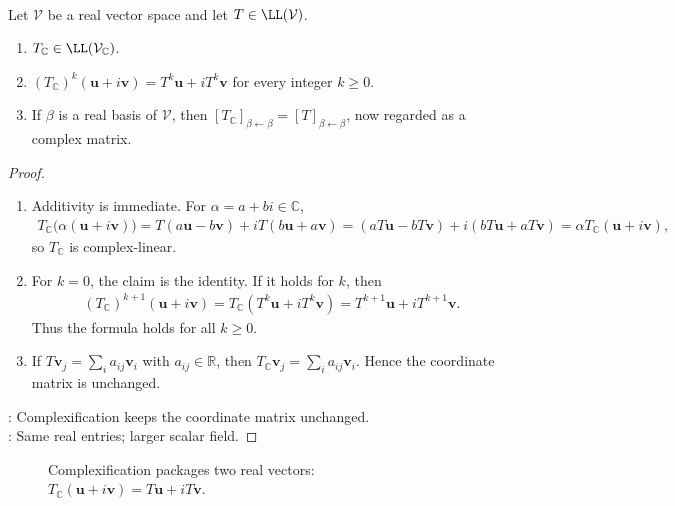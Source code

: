 \begin{proposition} \label{prop:complexification-operator-basic-properties} \\
Let $\mathcal{V}$ be a real vector space and let $T\in\LL(\mathcal{V})$.
\begin{enumerate}[label=(\roman*)]
\setlength{\itemsep}{0pt}
\item $T_{\mathbb{C}}\in\LL(\mathcal{V}_{\mathbb{C}})$.
\item $(T_{\mathbb{C}})^k(\mathbf{u}+i\mathbf{v})=T^k\mathbf{u}+iT^k\mathbf{v}$ for every integer $k\geq0$.
\item If $\beta$ is a real basis of $\mathcal{V}$, then $[T_{\mathbb{C}}]_{\beta\leftarrow\beta}=[T]_{\beta\leftarrow\beta}$, now regarded as a complex matrix.
\end{enumerate}
\begin{proof}
\begin{enumerate}[label=(\roman*)]
\setlength{\itemsep}{0pt}
\item Additivity is immediate. For $\alpha=a+bi\in\mathbb{C}$,
\begin{align}
T_{\mathbb{C}}\bigl(\alpha(\mathbf{u}+i\mathbf{v})\bigr) =T(a\mathbf{u}-b\mathbf{v})+iT(b\mathbf{u}+a\mathbf{v}) =(aT\mathbf{u}-bT\mathbf{v})+i(bT\mathbf{u}+aT\mathbf{v}) =\alpha T_{\mathbb{C}}(\mathbf{u}+i\mathbf{v}),
\nonumber
\end{align}
so $T_{\mathbb{C}}$ is complex-linear.
\item For $k=0$, the claim is the identity. If it holds for $k$, then
\begin{align}
(T_{\mathbb{C}})^{k+1}(\mathbf{u}+i\mathbf{v}) =T_{\mathbb{C}}(T^k\mathbf{u}+iT^k\mathbf{v}) =T^{k+1}\mathbf{u}+iT^{k+1}\mathbf{v}.
\nonumber
\end{align}
Thus the formula holds for all $k\geq0$.
\item If $T\mathbf{v}_j=\sum\limits_i a_{ij}\mathbf{v}_i$ with $a_{ij}\in\mathbb{R}$, then $T_{\mathbb{C}}\mathbf{v}_j=\sum\limits_i a_{ij}\mathbf{v}_i$. Hence the coordinate matrix is unchanged.
\end{enumerate}
: Complexification keeps the coordinate matrix unchanged.\\
: Same real entries; larger scalar field.
\end{proof}
\end{proposition}

\begin{figure}[H]
  \centering
  
  \caption{Complexification packages two real vectors: $T_{\mathbb{C}}(\mathbf{u}+i\mathbf{v})=T\mathbf{u}+iT\mathbf{v}$.}
  \label{fig:complexification-real-operator}
\end{figure}

